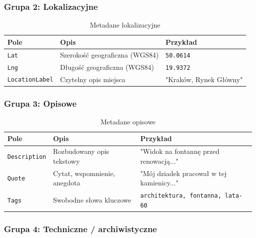 \documentclass[12pt, a4paper]{article}
\begin{document}
\subsubsection{Grupa 2: Lokalizacyjne}

\begin{table}[H]
  \centering
  \caption{Metadane lokalizacyjne}
  \begin{tabular}{@{}L{3.5cm}L{5.5cm}L{5cm}@{}}
    \toprule
    \textbf{Pole} & \textbf{Opis} & \textbf{Przykład} \\
    \midrule
    \texttt{Lat}           & Szerokość geograficzna (WGS84) & \texttt{50.0614} \\
    \texttt{Lng}           & Długość geograficzna (WGS84)   & \texttt{19.9372} \\
    \texttt{LocationLabel} & Czytelny opis miejsca          & "Kraków, Rynek Główny" \\
    \bottomrule
  \end{tabular}
\end{table}

\subsubsection{Grupa 3: Opisowe}

\begin{table}[H]
  \centering
  \caption{Metadane opisowe}
  \begin{tabular}{@{}L{3.5cm}L{5.5cm}L{5cm}@{}}
    \toprule
    \textbf{Pole} & \textbf{Opis} & \textbf{Przykład} \\
    \midrule
    \texttt{Description} & Rozbudowany opis tekstowy       & "Widok na fontannę przed renowacją..." \\
    \texttt{Quote}       & Cytat, wspomnienie, anegdota    & "Mój dziadek pracował w tej kamienicy..." \\
    \texttt{Tags}        & Swobodne słowa kluczowe         & \texttt{architektura, fontanna, lata-60} \\
    \bottomrule
  \end{tabular}
\end{table}

\subsubsection{Grupa 4: Techniczne / archiwistyczne}
\end{document}

